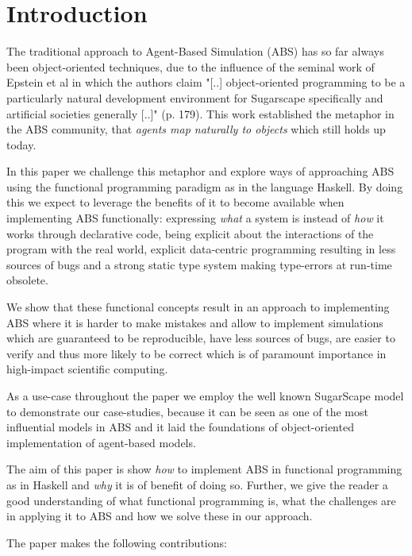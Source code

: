 \section{Introduction}
The traditional approach to Agent-Based Simulation (ABS) has so far always been object-oriented techniques, due to the influence of the seminal work of Epstein et al \cite{epstein_growing_1996} in which the authors claim "[..] object-oriented programming to be a particularly natural development environment for Sugarscape specifically and artificial societies generally [..]" (p. 179). This work established the metaphor in the ABS community, that \textit{agents map naturally to objects} \citep{north_managing_2007} which still holds up today.

In this paper we challenge this metaphor and explore ways of approaching ABS using the functional programming paradigm as in the language Haskell. By doing this we expect to leverage the benefits of it \citep{hudak_history_2007} to become available when implementing ABS functionally: expressing \textit{what} a system is instead of \textit{how} it works through declarative code, being explicit about the interactions of the program with the real world, explicit data-centric programming resulting in less sources of bugs and a strong static type system making type-errors at run-time obsolete. 

We show that these functional concepts result in an approach to implementing ABS where it is harder to make mistakes and allow to implement simulations which are guaranteed to be reproducible, have less sources of bugs, are easier to verify and thus more likely to be correct which is of paramount importance in high-impact scientific computing. 

As a use-case throughout the paper we employ the well known SugarScape model \citep{epstein_growing_1996} to demonstrate our case-studies, because it can be seen as one of the most influential models in ABS and it laid the foundations of object-oriented implementation of agent-based models.

The aim of this paper is show \textit{how} to implement ABS in functional programming as in Haskell and \textit{why} it is of benefit of doing so. Further, we give the reader a good understanding of what functional programming is, what the challenges are in applying it to ABS and how we solve these in our approach. 

The paper makes the following contributions:


